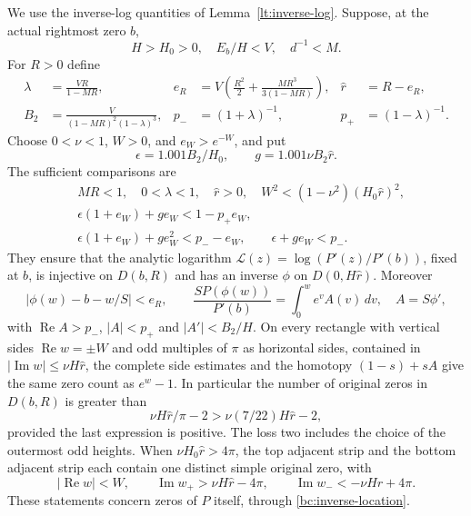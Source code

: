 \documentclass[11pt,reqno]{amsart}
\numberwithin{equation}{section}
\theoremstyle{definition}
\theoremstyle{remark}
\renewcommand{\Re}{\operatorname{Re}}
\renewcommand{\Im}{\operatorname{Im}}
\begin{document}
We use the inverse-log quantities of Lemma~\ref{lt:inverse-log}.
Suppose, at the actual rightmost zero $b$,
\begin{equation}\label{bc:field-hypotheses}
 H>H_0>0,\quad E_b/H<V,\quad d^{-1}<M.
\end{equation}
For $R>0$ define
\begin{align}
 \lambda&=\frac{VR}{1-MR},&
 e_R&=V\left(\frac{R^2}2+\frac{MR^3}{3(1-MR)}\right),
 &\widehat r&=R-e_R,                                  \label{bc:inverse-def-1}\\
 B_2&=\frac{V}{(1-MR)^2(1-\lambda)^3},&
 p_-&=(1+\lambda)^{-1},&p_+&=(1-\lambda)^{-1}.
                                                               \label{bc:inverse-def-2}
\end{align}
Choose $0<\nu<1$, $W>0$, and $e_W>e^{-W}$, and put
\[
 \epsilon=1.001B_2/H_0,\qquad g=1.001\nu B_2\widehat r.
\]
The sufficient comparisons are
\begin{align}
 &MR<1,\quad 0<\lambda<1,\quad \widehat r>0,
       \quad W^2<(1-\nu^2)(H_0\widehat r)^2,
                                                    \label{bc:inverse-gates-1}\\
 &\epsilon(1+e_W)+ge_W<1-p_+e_W,
                                                    \label{bc:inverse-gates-2}\\
 &\epsilon(1+e_W)+ge_W^2<p_--e_W,
       \qquad \epsilon+ge_W<p_-.                   \label{bc:inverse-gates-3}
\end{align}
They ensure that the analytic logarithm
$\mathcal L(z)=\log(P'(z)/P'(b))$, fixed at $b$, is injective on
$D(b,R)$ and has an inverse $\phi$ on $D(0,H\widehat r)$.
Moreover
\begin{equation}\label{bc:inverse-location}
 |\phi(w)-b-w/S|<e_R,\qquad
 \frac{SP(\phi(w))}{P'(b)}=\int_0^we^v A(v)\,dv,\quad A=S\phi',
\end{equation}
with $\Re A>p_-$, $|A|<p_+$ and $|A'|<B_2/H$.
On every rectangle with vertical sides $\Re w=\pm W$ and odd
multiples of $\pi$ as horizontal sides, contained in
$|\Im w|\leq\nu H\widehat r$, the complete side estimates and
the homotopy $(1-s)+sA$ give the same zero count as $e^w-1$.
In particular the number of original zeros in $D(b,R)$ is greater than
\begin{equation}\label{bc:inverse-count}
 \nu H\widehat r/\pi-2>
 \nu(7/22)H\widehat r-2,
\end{equation}
provided the last expression is positive.  The loss two includes the
choice of the outermost odd heights.  When
$\nu H_0\widehat r>4\pi$, the top adjacent strip and the bottom
adjacent strip each contain one distinct simple original zero, with
\begin{equation}\label{bc:high-strips}
 |\Re w|<W,\qquad
 \Im w_+>\nu H\widehat r-4\pi,\qquad
 \Im w_-<-\nu H\widehat r+4\pi.
\end{equation}
These statements concern zeros of $P$ itself, through
\eqref{bc:inverse-location}.
\end{document}
